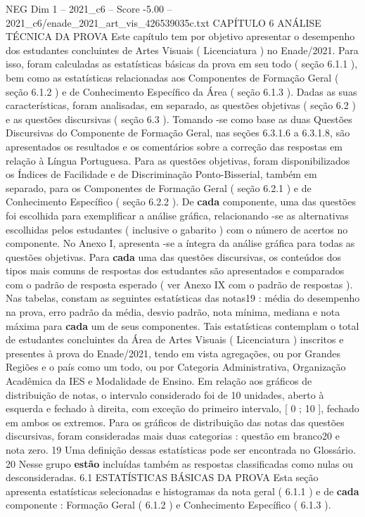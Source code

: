 \begin{textsample}{NEG Dim 1 – 2021\_c6 – Score -5.00 – 2021\_c6/enade\_2021\_art\_vis\_426539035c.txt}  \label{ex:f1_neg_231}
CAPÍTULO 6 ANÁLISE TÉCNICA DA PROVA Este capítulo tem por objetivo apresentar o desempenho dos estudantes concluintes de Artes Visuais ( Licenciatura ) no Enade/2021.
Para isso, foram calculadas as estatísticas básicas da prova em seu todo ( seção 6.1.1 ), bem como as estatísticas relacionadas aos Componentes de Formação Geral ( seção 6.1.2 ) e de Conhecimento Específico da Área ( seção 6.1.3 ).
Dadas as suas características, foram analisadas, em separado, as questões objetivas ( seção 6.2 ) e as questões discursivas ( seção 6.3 ).
Tomando -se como base as duas Questões Discursivas do Componente de Formação Geral, nas seções 6.3.1.6 a 6.3.1.8, são apresentados os resultados e os comentários sobre a correção das respostas em relação à Língua Portuguesa.
Para as questões objetivas, foram disponibilizados os Índices de Facilidade e de Discriminação Ponto-Bisserial, também em separado, para os Componentes de Formação Geral ( seção 6.2.1 ) e de Conhecimento Específico ( seção 6.2.2 ).
De \textbf{cada} componente, uma das questões foi escolhida para exemplificar a análise gráfica, relacionando -se as alternativas escolhidas pelos estudantes ( inclusive o gabarito ) com o número de acertos no componente.
No Anexo I, apresenta -se a íntegra da análise gráfica para todas as questões objetivas.
Para \textbf{cada} uma das questões discursivas, os conteúdos dos tipos mais comuns de respostas dos estudantes são apresentados e comparados com o padrão de resposta esperado ( ver Anexo IX com o padrão de respostas ).
Nas tabelas, constam as seguintes estatísticas das notas19 : média do desempenho na prova, erro padrão da média, desvio padrão, nota mínima, mediana e nota máxima para \textbf{cada} um de seus componentes.
Tais estatísticas contemplam o total de estudantes concluintes da Área de Artes Visuais ( Licenciatura ) inscritos e presentes à prova do Enade/2021, tendo em vista agregações, ou por Grandes Regiões e o país como um todo, ou por Categoria Administrativa, Organização Acadêmica da IES e Modalidade de Ensino.
Em relação aos gráficos de distribuição de notas, o intervalo considerado foi de 10 unidades, aberto à esquerda e fechado à direita, com exceção do primeiro intervalo, [ 0 ; 10 ], fechado em ambos os extremos.
Para os gráficos de distribuição das notas das questões discursivas, foram consideradas mais duas categorias : questão em branco20 e nota zero. 19 Uma definição dessas estatísticas pode ser encontrada no Glossário. 20 Nesse grupo \textbf{estão} incluídas também as respostas classificadas como nulas ou desconsideradas. 6.1 ESTATÍSTICAS BÁSICAS DA PROVA Esta seção apresenta estatísticas selecionadas e histogramas da nota geral ( 6.1.1 ) e de \textbf{cada} componente : Formação Geral ( 6.1.2 ) e Conhecimento Específico ( 6.1.3 ).

\end{textsample}
